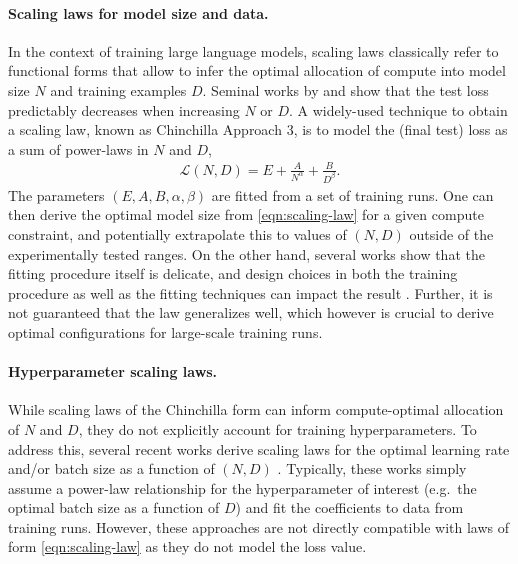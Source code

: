 \documentclass[12pt,a4paper,twoside]{article}
\begin{document}
\paragraph{Scaling laws for model size and data.} In the context of training large language models, scaling laws classically refer to functional forms that allow to infer the optimal allocation of compute into model size $N$ and training examples $D$. Seminal works by \citet{Kaplan2020} and \citet{Hoffmann2022} show that the test loss predictably decreases when increasing $N$ or $D$. A widely-used technique to obtain a scaling law, known as Chinchilla Approach 3, is to model the (final test) loss as a sum of power-laws in $N$ and $D$, \ie
\begin{align}\label{eqn:scaling-law}
    \mathcal{L}(N,D) = E + \frac{A}{N^\alpha} + \frac{B}{D^\beta}.
\end{align}
The parameters $(E,A,B,\alpha,\beta)$ are fitted from a set of training runs. One can then derive the optimal model size from \eqref{eqn:scaling-law} for a given compute constraint, and potentially extrapolate this to values of $(N,D)$ outside of the experimentally tested ranges. On the other hand, several works show that the fitting procedure itself is delicate, and design choices in both the training procedure as well as the fitting techniques can impact the result \citep{Besiroglu2024,Li2025a}. Further, it is not guaranteed that the law generalizes well, which however is crucial to derive optimal configurations for large-scale training runs.%

\paragraph{Hyperparameter scaling laws.} While scaling laws of the Chinchilla form can inform compute-optimal allocation of $N$ and $D$, they do not explicitly account for training hyperparameters. To address this, several recent works derive scaling laws for the optimal learning rate and/or batch size as a function of $(N,D)$ \citep{DeepSeekAI2024,Li2025,Ruette2026}. Typically, these works simply assume a power-law relationship for the hyperparameter of interest (e.g.\ the optimal batch size as a function of $D$) and fit the coefficients to data from training runs. However, these approaches are not directly compatible with laws of form \eqref{eqn:scaling-law} as they do not model the loss value. 
\end{document}
